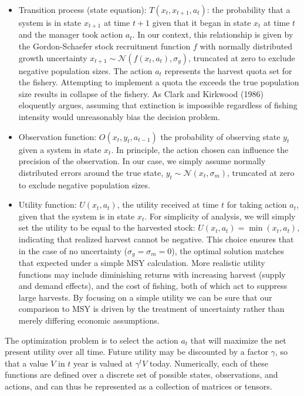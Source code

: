\documentclass[3p]{elsarticle} %
\begin{document}
\begin{itemize}
\item
  Transition process (state equation): \(T(x_t, x_{t+1}, a_t)\): the
  probability that a system is in state \(x_{t+1}\) at time \(t+1\)
  given that it began in state \(x_t\) at time \(t\) and the manager
  took action \(a_t\). In our context, this relationship is given by the
  Gordon-Schaefer stock recruitment function \(f\) with normally
  distributed growth uncertainty
  \(x_{t+1} \sim \mathcal{N}(f(x_t,a_t), \sigma_g)\), truncated at zero
  to exclude negative population sizes. The action \(a_t\) represents
  the harvest quota set for the fishery. Attempting to implement a quota
  the exceeds the true population size results in collapse of the
  fishery. As Clark and Kirkwood (1986) eloquently argues, assuming that
  extinction is impossible regardless of fishing intensity would
  unreasonably bias the decision problem.
\item
  Observation function: \(O(x_t,y_t,a_{t-1})\) the probability of
  observing state \(y_t\) given a system in state \(x_t\). In principle,
  the action chosen can influence the precision of the observation. In
  our case, we simply assume normally distributed errors around the true
  state, \(y_t \sim \mathcal{N}(x_t, \sigma_m)\), truncated at zero to
  exclude negative population sizes.
\item
  Utility function: \(U(x_t,a_t)\), the utility received at time \(t\)
  for taking action \(a_t\), given that the system is in state \(x_t\).
  For simplicity of analysis, we will simply set the utility to be equal
  to the harvested stock: \(U(x_t, a_t) = \min(x_t, a_t)\), indicating
  that realized harvest cannot be negative. This choice ensures that in
  the case of no uncertainty (\(\sigma_g = \sigma_m = 0\)), the optimal
  solution matches that expected under a simple MSY calculation. More
  realistic utility functions may include diminishing returns with
  increasing harvest (supply and demand effects), and the cost of
  fishing, both of which act to suppress large harvests. By focusing on
  a simple utility we can be sure that our comparison to MSY is driven
  by the treatment of uncertainty rather than merely differing economic
  assumptions.
\end{itemize}

The optimization problem is to select the action \(a_t\) that will
maximize the net present utility over all time. Future utility may be
discounted by a factor \(\gamma\), so that a value \(V\) in \(t\) year
is valued at \(\gamma^t V\) today. Numerically, each of these functions
are defined over a discrete set of possible states, observations, and
actions, and can thus be represented as a collection of matrices or
tensors.
\end{document}
